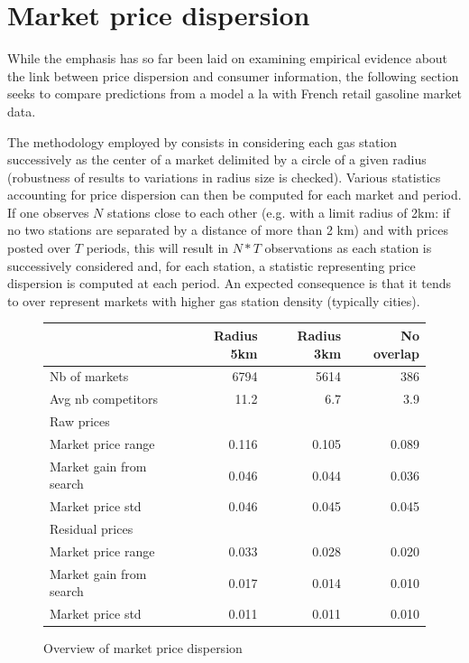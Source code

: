 \documentclass[11pt]{article}
\begin{document}
\section{Market price dispersion}

While the emphasis has so far been laid on examining empirical evidence about the link between price dispersion and consumer information, the following section seeks to compare predictions from a model a la \cite{VAR80} with French retail gasoline market data.

The methodology employed by \cite{TAP11} consists in considering each gas station successively as the center of a market delimited by a circle of a given radius (robustness of results to variations in radius size is checked). Various statistics accounting for price dispersion can then be computed for each market and period. If one observes $N$ stations close to each other (e.g. with a limit radius of 2km: if no two stations are separated by a distance of more than 2 km) and with prices posted over $T$ periods, this will result in $N*T$ observations as each station is successively considered and, for each station, a statistic representing price dispersion is computed at each period. An expected consequence is that it tends to over represent markets with higher gas station density (typically cities).

\begin{figure}[H]
\caption{Overview of market price dispersion}
\begin{center}
\begin{tabular}{lrrr}
\hline
{} & Radius 5km & Radius 3km & No overlap\\
\hline
Nb of markets & 6794 & 5614 & 386 \\
Avg nb competitors & 11.2 & 6.7 & 3.9 \\
\hline
Raw prices & & & \\
\hline
Market price range & 0.116 & 0.105 & 0.089\\
Market gain from search & 0.046 & 0.044 & 0.036 \\
Market price std & 0.046 & 0.045 & 0.045 \\
\hline
Residual prices & & & \\
\hline
Market price range & 0.033  & 0.028 & 0.020 \\
Market gain from search & 0.017 & 0.014 & 0.010 \\
Market price std & 0.011 & 0.011 & 0.010 \\
\hline
\end{tabular}
\end{center}
\end{figure}
\end{document}
